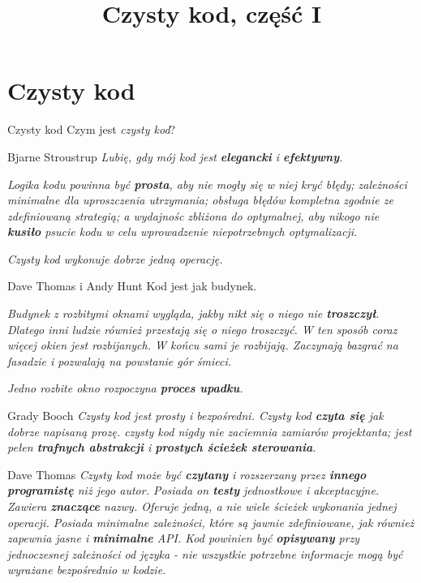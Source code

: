 

\title{Czysty kod, część I}



\section{Czysty kod}

\begin{frame}{Czysty kod}
	Czym jest \emph{czysty kod}?
\end{frame}

\begin{frame}{Bjarne Stroustrup}
	\emph{Lubię, gdy mój kod jest \textbf{elegancki} i \textbf{efektywny}.}
	
	\emph{Logika kodu powinna być \textbf{prosta}, aby nie mogły się w niej kryć błędy; zależności minimalne dla uproszczenia utrzymania; obsługa błędów kompletna zgodnie ze zdefiniowaną strategią; a wydajnośc zbliżona do optymalnej, aby nikogo nie \textbf{kusiło} psucie kodu w celu wprowadzenie niepotrzebnych optymalizacji.}
	
	\emph{Czysty kod wykonuje dobrze jedną operację.}
\end{frame}

\begin{frame}{Dave Thomas i Andy Hunt}
	Kod jest jak budynek.
	
	\emph{Budynek z rozbitymi oknami wygląda, jakby nikt się o niego nie \textbf{troszczył}. Dlatego inni ludzie również przestają się o niego troszczyć. W ten sposób coraz więcej okien jest rozbijanych. W końcu sami je rozbijają. Zaczynają bazgrać na fasadzie i pozwalają na powstanie gór śmieci.}
	
	\emph{Jedno rozbite okno rozpoczyna \textbf{proces upadku}.}
\end{frame}

\begin{frame}{Grady Booch}
	\emph{Czysty kod jest prosty i bezpośredni. Czysty kod \textbf{czyta się} jak dobrze napisaną prozę. czysty kod nigdy nie zaciemnia zamiarów projektanta; jest pełen \textbf{trafnych abstrakcji} i \textbf{prostych ścieżek sterowania}.}
\end{frame}

\begin{frame}{Dave Thomas}
	\emph{Czysty kod może być \textbf{czytany} i rozszerzany przez \textbf{innego programistę} niż jego autor. Posiada on \textbf{testy} jednostkowe i akceptacyjne. Zawiera \textbf{znaczące} nazwy. Oferuje jedną, a nie wiele ścieżek wykonania jednej operacji. Posiada minimalne zależności, które są jawnie zdefiniowane, jak również zapewnia jasne i \textbf{minimalne} API. Kod powinien być \textbf{opisywany} przy jednoczesnej zależności od języka - nie wszystkie potrzebne informacje mogą być wyrażane bezpośrednio w kodzie.}
\end{frame}

